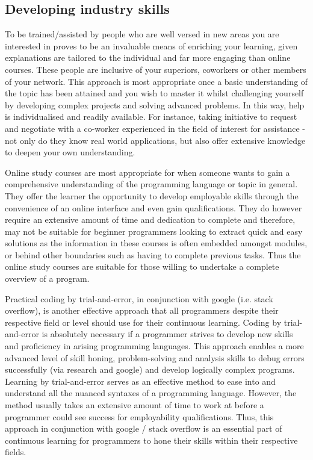 \documentclass[a4paper, 11pt]{report}
\begin{document}
\subsection{Developing industry skills}

To be trained/assisted by people who are well versed in new areas you are interested in proves to be an invaluable means of enriching your learning, given explanations are tailored to the individual and far more engaging than online courses. These people are inclusive of your superiors, coworkers or other members of your network. This approach is most appropriate once a basic understanding of the topic has been attained and you wish to master it whilst challenging yourself by developing complex projects and solving advanced problems. In this way, help is individualised and readily available. For instance, taking initiative to request and negotiate with a co-worker experienced in the field of interest for assistance - not only do they know real world applications, but also offer extensive knowledge to deepen your own understanding.

Online study courses are most appropriate for when someone wants to gain a comprehensive understanding of the programming language or topic in general. They offer the learner the opportunity to develop employable skills through the convenience of an online interface and even gain qualifications. They do however require an extensive amount of time and dedication to complete and therefore, may not be suitable for beginner programmers looking to extract quick and easy solutions as the information in these courses is often embedded amongst modules, or behind other boundaries such as having to complete previous tasks. Thus the online study courses are suitable for those willing to undertake a complete overview of a program.

Practical coding by trial-and-error, in conjunction with google (i.e. stack overflow), is another effective approach that all programmers despite their respective field or level should use for their continuous learning. Coding by trial-and-error is absolutely necessary if a programmer strives to develop new skills and proficiency in arising programming languages. This approach enables a more advanced level of skill honing, problem-solving and analysis skills to debug errors successfully (via research and google) and develop logically complex programs. Learning by trial-and-error serves as an effective method to ease into and understand all the nuanced syntaxes of a programming language. However, the method usually takes an extensive amount of time to work at before a programmer could see success for employability qualifications. Thus, this approach in conjunction with google / stack overflow is an essential part of continuous learning for programmers to hone their skills within their respective fields.
\end{document}
